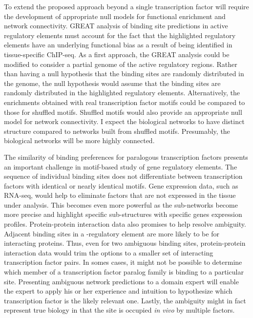 To extend the proposed approach beyond a single transcription factor will require the development of appropriate
null models for functional enrichment and network connectivity.  GREAT analysis of binding site predictions in active
regulatory elements must account for the fact that the highlighted regulatory elements have an underlying functional
bias as a result of being identified in tissue-specific ChIP-seq.  As a first approach, the GREAT analysis could be modified to consider a partial genome of the active
regulatory regions.  Rather than having a null hypothesis that the binding sites are randomly distributed in the
genome, the null hypothesis would assume that the binding sites are randomly distributed in the highlighted regulatory
elements.  Alternatively, the enrichments obtained with real transcription factor motifs could be compared to those
for shuffled motifs.  Shuffled motifs would also provide an appropriate null model for network connectivity.  I expect
the biological networks to have distinct structure compared to networks built from shuffled motifs.  Presumably,
the biological networks will be more highly connected.

The similarity of binding preferences for paralogous transcription factors presents an important challenge in motif-based
study of gene regulatory elements.  The sequence of individual binding sites does not differentiate between transcription
factors with identical or nearly identical motifs.  Gene expression data, such as RNA-seq, would help to eliminate
factors that are not expressed in the tissue under analysis.  This becomes even more powerful as the sub-networks
become more precise and highlight specific sub-structures with specific genes expression profiles.  Protein-protein interaction
data also promises to help resolve ambiguity.  Adjacent binding sites in a \cis-regulatory element are more likely to be for
interacting proteins.  Thus, even for two ambiguous binding sites, protein-protein interaction data would trim the options
to a smaller set of interacting transcription factor pairs.  In somes cases, it might not be possible to determine which
member of a transcription factor paralog family is binding to a particular site.  Presenting ambiguous network predictions
to a domain expert will enable the expert to apply his or her experience and intuition to hypothesize which transcription
factor is the likely relevant one.  Lastly, the ambiguity might in fact represent true biology in that the site is
occupied \textit{in vivo} by multiple factors.

